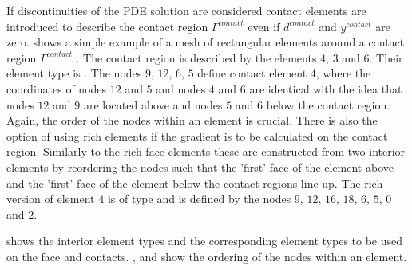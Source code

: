 If discontinuities of the PDE solution are considered contact elements
 are introduced to describe the contact region $\Gamma^{contact}$
even if $d^{contact}$ and $y^{contact}$ are zero.  shows a simple example of a mesh
of rectangular elements around a contact region $\Gamma^{contact}$ .
The contact region is described by the
elements $4$, $3$ and $6$. Their element type is .
The nodes $9$, $12$, $6$, $5$ define contact element $4$, where the coordinates of nodes $12$ and $5$ and
nodes $4$ and $6$ are identical with the idea that nodes $12$ and $9$ are located above and
nodes $5$ and $6$ below the contact region.
Again, the order of the nodes within an element is crucial. There is also the option of using rich elements
if the gradient is to be calculated on the contact region. Similarly to the rich face elements
these are constructed from two interior elements by reordering the nodes such that
the 'first' face of the element above and the 'first' face of the element below the
contact regions line up.  The rich version of element
$4$ is of type  and is defined by the nodes $9$, $12$, $16$, $18$, $6$, $5$, $0$ and
$2$.



 shows the interior element types and the corresponding element types to be used
on the face and contacts. ,  and  show the ordering of
the nodes within an element.

